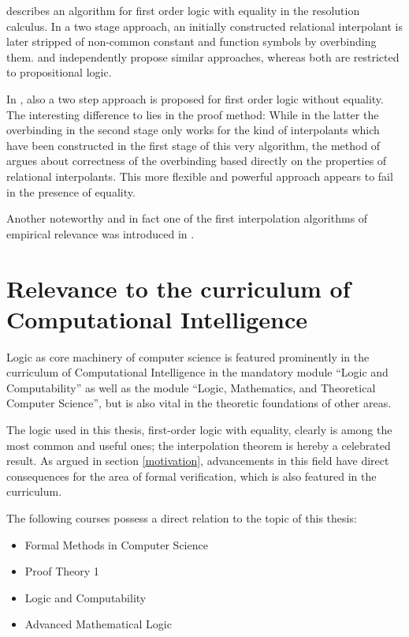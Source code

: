 \documentclass[,%
			paper=a4,%
			DIV12,
			liststotoc,
			bibtotoc,
			draft=false,%
			numbers=noendperiod
			]{scrartcl}
\theoremstyle{definition}
\begin{document}
\cite{Huang95} describes an algorithm for first order logic with equality in the resolution calculus. In a two stage approach, an initially constructed relational interpolant is later stripped of non-common constant and function symbols by overbinding them.
\cite{Pudlak97} and \cite{krajivcek1997interpolation} independently propose similar approaches, whereas both are restricted to propositional logic.

In \cite{baaz2011methods}, also a two step approach is proposed for first order logic without equality.
The interesting difference to \cite{Huang95} lies in the proof method:
While in the latter the overbinding in the second stage only works for the kind of interpolants which have been constructed in the first stage of this very algorithm, the method of \cite{baaz2011methods} argues about correctness of the overbinding based directly on the properties of relational interpolants.
This more flexible and powerful approach appears to fail in the presence of equality.

Another noteworthy and in fact one of the first interpolation algorithms of empirical relevance was introduced in \cite{McMillan03}.




\section{Relevance to the curriculum of Computational Intelligence}

Logic as core machinery of computer science is featured prominently in the curriculum of Computational Intelligence in the mandatory module ``Logic and Computability'' as well as the module ``Logic, Mathematics, and Theoretical Computer Science'', but is also vital in the theoretic foundations of other areas. 

The logic used in this thesis, first-order logic with equality, clearly is among the most common and useful ones; the interpolation theorem is hereby a celebrated result.
As argued in section \ref{motivation}, advancements in this field have direct consequences for the area of formal verification, which is also featured in the curriculum.

The following courses possess a direct relation to the topic of this thesis: 
\begin{itemize}
	\item Formal Methods in Computer Science
	\item Proof Theory 1 
	\item Logic and Computability 
	\item Advanced Mathematical Logic 
\end{itemize}


\nocite{*} %


\end{document}
